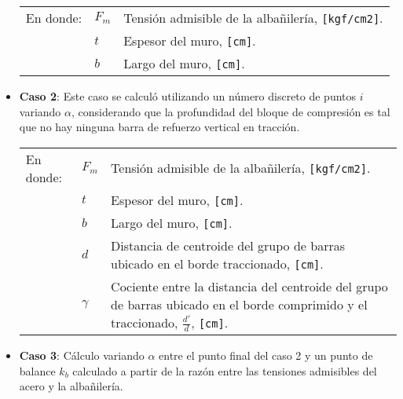 \begin{itemize}
	\vspace{-0.4cm}
	\begin{table}[H]
		\centering
		\begin{tabular}{lp{1cm}p{9.0cm}}
			En donde:	& $F_m$ &Tensión admisible de la albañilería, \texttt{[kgf/cm2]}.\\
			& $t$ & Espesor del muro, \texttt{[cm]}.\\
			& $b$ & Largo del muro, \texttt{[cm]}.\\
		\end{tabular}
	\end{table}
	
	\item \textbf{Caso 2}: Este caso se calculó utilizando un número discreto de puntos $i$ variando $\alpha$, considerando que la profundidad del bloque de compresión es tal que no hay ninguna barra de refuerzo vertical en tracción.
	
	\newpage
	\vspace{-0.4cm}
	\begin{table}[H]
		\centering
		\begin{tabular}{lp{1cm}p{9.0cm}}
			En donde:	& $F_m$ &Tensión admisible de la albañilería, \texttt{[kgf/cm2]}.\\
			& $t$ & Espesor del muro, \texttt{[cm]}.\\
			& $b$ & Largo del muro, \texttt{[cm]}.\\
			& $d$ & Distancia  de centroide del grupo de barras ubicado en el borde traccionado, \texttt{[cm]}.\\
			& $\gamma$ & Cociente entre la distancia del centroide del grupo de barras ubicado en el borde comprimido y el traccionado, $\frac{d'}{d}$, \texttt{[cm]}.\\
		\end{tabular}
	\end{table}
	
	\item \textbf{Caso 3}: Cálculo variando $\alpha$ entre el punto final del caso 2 y un punto de balance $k_b$ calculado a partir de la razón entre las tensiones admisibles del acero y la albañilería.
	

\end{itemize}
